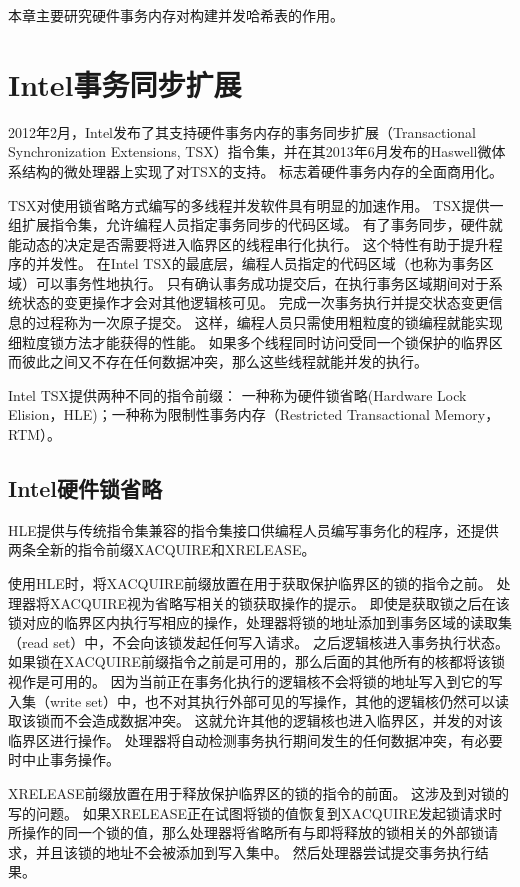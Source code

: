 本章主要研究硬件事务内存对构建并发哈希表的作用。

\section{Intel事务同步扩展}
2012年2月，Intel发布了其支持硬件事务内存的事务同步扩展（Transactional Synchronization Extensions, TSX）指令集，并在其2013年6月发布的Haswell微体系结构的微处理器上实现了对TSX的支持。
标志着硬件事务内存的全面商用化。

TSX对使用锁省略方式编写的多线程并发软件具有明显的加速作用。 
TSX提供一组扩展指令集，允许编程人员指定事务同步的代码区域。
有了事务同步，硬件就能动态的决定是否需要将进入临界区的线程串行化执行。
这个特性有助于提升程序的并发性。
在Intel TSX的最底层，编程人员指定的代码区域（也称为事务区域）可以事务性地执行。
只有确认事务成功提交后，在执行事务区域期间对于系统状态的变更操作才会对其他逻辑核可见。
完成一次事务执行并提交状态变更信息的过程称为一次原子提交。
这样，编程人员只需使用粗粒度的锁编程就能实现细粒度锁方法才能获得的性能。
如果多个线程同时访问受同一个锁保护的临界区而彼此之间又不存在任何数据冲突，那么这些线程就能并发的执行。

Intel TSX提供两种不同的指令前缀：
一种称为硬件锁省略(Hardware Lock Elision，HLE)；一种称为限制性事务内存（Restricted Transactional Memory，RTM）。

\subsection{Intel硬件锁省略}
HLE提供与传统指令集兼容的指令集接口供编程人员编写事务化的程序，还提供两条全新的指令前缀XACQUIRE和XRELEASE。

使用HLE时，将XACQUIRE前缀放置在用于获取保护临界区的锁的指令之前。
处理器将XACQUIRE视为省略写相关的锁获取操作的提示。
即使是获取锁之后在该锁对应的临界区内执行写相应的操作，处理器将锁的地址添加到事务区域的读取集（read set）中，不会向该锁发起任何写入请求。
之后逻辑核进入事务执行状态。
如果锁在XACQUIRE前缀指令之前是可用的，那么后面的其他所有的核都将该锁视作是可用的。
因为当前正在事务化执行的逻辑核不会将锁的地址写入到它的写入集（write set）中，也不对其执行外部可见的写操作，其他的逻辑核仍然可以读取该锁而不会造成数据冲突。
这就允许其他的逻辑核也进入临界区，并发的对该临界区进行操作。
处理器将自动检测事务执行期间发生的任何数据冲突，有必要时中止事务操作。

XRELEASE前缀放置在用于释放保护临界区的锁的指令的前面。
这涉及到对锁的写的问题。
如果XRELEASE正在试图将锁的值恢复到XACQUIRE发起锁请求时所操作的同一个锁的值，那么处理器将省略所有与即将释放的锁相关的外部锁请求，并且该锁的地址不会被添加到写入集中。
然后处理器尝试提交事务执行结果。

